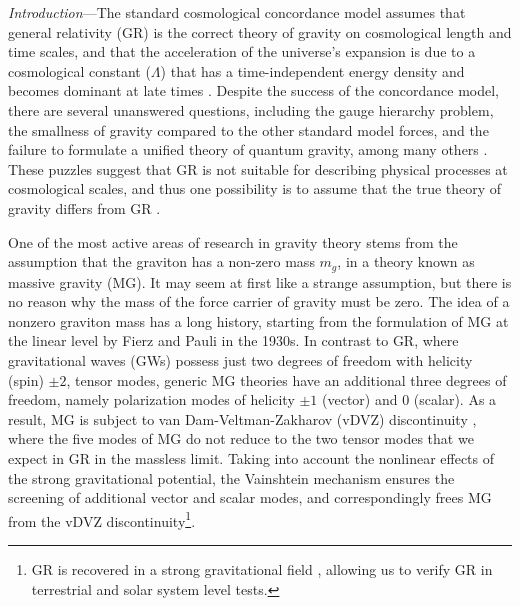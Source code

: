 \documentclass[prd,twocolumn,aps,psfig,nofootinbib,nobibnotes,superscriptaddress,preprintnumbers,times]{revtex4-2}
\begin{document}
\textit{Introduction}---The standard cosmological concordance model assumes that general relativity (GR) is the correct theory of gravity on cosmological length and time scales, and that the acceleration of the universe's expansion is due to a cosmological constant ($\Lambda$) that has a time-independent energy density and becomes dominant at late times \cite{Dodelson:2020bqr}. 
Despite the success of the concordance model, there are several unanswered questions, including the gauge hierarchy problem, the smallness of gravity compared to the other standard model forces, and the failure to formulate a unified theory of quantum gravity, among many others \cite{Dvali:2013qwe, Moffat:1998vi}. 
These puzzles suggest that GR is not suitable for describing physical processes at cosmological scales, and thus one possibility is to assume that the true theory of gravity differs from GR \cite{deRham:2023byw}. 


One of the most active areas of research in gravity theory stems from the assumption that the graviton has a non-zero mass $m_g$, in a theory known as massive gravity (MG). It may seem at first like a strange assumption, but there is no reason why the mass of the force carrier of gravity must be zero. The idea of a nonzero graviton mass has a long history, starting from the formulation of MG at the linear level by Fierz and Pauli \cite{Fierz:1939ix} in the 1930s. In contrast to GR, where gravitational waves (GWs) possess just two degrees of freedom with helicity (spin) $\pm 2$, tensor modes, generic MG theories have an additional three degrees of freedom, namely polarization modes of helicity  $\pm 1$ (vector) and $0$ (scalar). As a result, MG is subject to van Dam-Veltman-Zakharov (vDVZ) discontinuity \cite{vanDam:1970vg,Zakharov:1970cc}, where the five modes of MG do not reduce to the two tensor modes that we expect in GR in the massless limit.
Taking into account the nonlinear effects of the strong gravitational potential, the Vainshtein mechanism \cite{Vainshtein:1972sx} ensures the screening of additional vector and scalar modes, and correspondingly frees MG from the vDVZ discontinuity\footnote{GR is recovered in a strong gravitational field \cite{Tasinato:2013rza}, allowing us to verify GR in terrestrial and solar system level tests.}.
\end{document}
